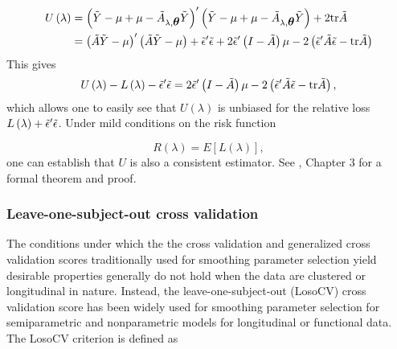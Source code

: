 \begin{align}
\begin{split}
U\left(\lambda\right) &= \left( \tilde{Y} - \mu + \mu - \tilde{A}_{\lambda,\mbox{\boldmath $\theta$}} \tilde{Y} \right)'\left( \tilde{Y} - \mu + \mu - \tilde{A}_{\lambda,\mbox{\boldmath $\theta$}} \tilde{Y} \right) + 2\mbox{tr}\tilde{A} \\
&= \left(\tilde{A} \tilde{Y} - \mu \right)'\left( \tilde{A} \tilde{Y} - \mu \right) + \tilde{\epsilon}'\tilde{\epsilon} + 2\tilde{\epsilon}' \left( I- \tilde{A}\right)\mu- 2\left( \tilde{\epsilon}'\tilde{A} \tilde{\epsilon} -  \mbox{tr}\tilde{A}\right)
\end{split}
\end{align}
\noindent
This gives
\begin{equation} 
U\left(\lambda\right) - L\left(\lambda\right) - \tilde{\epsilon}'\tilde{\epsilon}  =  2\tilde{\epsilon}' \left( I- \tilde{A}\right)\mu- 2\left( \tilde{\epsilon}'\tilde{A} \tilde{\epsilon} -  \mbox{tr}\tilde{A}\right), 
\end{equation}
 \noindent
 which allows one to easily see that $U\left(\lambda\right)$ is unbiased for the relative loss $L\left(\lambda\right) + \tilde{\epsilon}'\tilde{\epsilon}$.  Under mild conditions on the risk function
 
 \[
 R\left(\lambda\right) = E\left[L\left(\lambda\right)\right],
 \]
\noindent
one can establish that $U$ is also a consistent estimator. See \cite{gu2013smoothing}, Chapter 3 for a formal theorem and proof.


\subsubsection{Leave-one-subject-out cross validation}  
The conditions under which the the cross validation and generalized cross validation scores traditionally used for smoothing parameter selection yield desirable properties generally do not hold when the data are clustered or longitudinal in nature. Instead, the leave-one-subject-out (LosoCV) cross validation score has been widely used for smoothing parameter selection for semiparametric and nonparametric models for longitudinal or functional data. The LosoCV criterion is defined as

